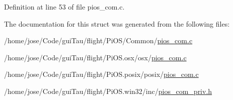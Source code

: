Definition at line 53 of file pios\-\_\-com.\-c.



The documentation for this struct was generated from the following files\-:\begin{DoxyCompactItemize}
\item 
/home/jose/\-Code/gui\-Tau/flight/\-Pi\-O\-S/\-Common/\hyperlink{_common_2pios__com_8c}{pios\-\_\-com.\-c}\item 
/home/jose/\-Code/gui\-Tau/flight/\-Pi\-O\-S.\-osx/osx/\hyperlink{osx_2osx_2pios__com_8c}{pios\-\_\-com.\-c}\item 
/home/jose/\-Code/gui\-Tau/flight/\-Pi\-O\-S.\-posix/posix/\hyperlink{posix_2posix_2pios__com_8c}{pios\-\_\-com.\-c}\item 
/home/jose/\-Code/gui\-Tau/flight/\-Pi\-O\-S.\-win32/inc/\hyperlink{win32_2inc_2pios__com__priv_8h}{pios\-\_\-com\-\_\-priv.\-h}\end{DoxyCompactItemize}

